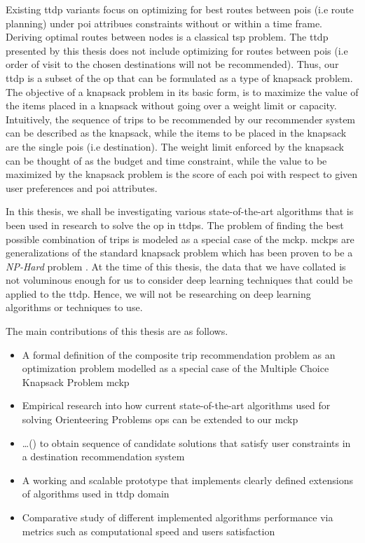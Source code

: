 Existing \gls{ttdp} variants focus on optimizing for best routes between \glspl{poi} (i.e route planning) under \gls{poi} attribues constraints without or within a time frame. Deriving optimal routes between nodes is a classical \gls{tsp} problem. The \gls{ttdp} presented by this thesis does not include optimizing for routes between \glspl{poi} (i.e order of visit to the chosen destinations will not be recommended). Thus, our \gls{ttdp} is a subset of the \gls{op} that can be formulated as a type of knapsack problem. The objective of a knapsack problem in its basic form, is to maximize the value of the items placed in a knapsack without going over a weight limit or capacity. Intuitively, the sequence of trips to be recommended by our recommender system can be described as the knapsack, while the items to be placed in the knapsack are the single \glspl{poi} (i.e destination). The weight limit enforced by the knapsack can be thought of as the budget and time constraint, while the value to be maximized by the knapsack problem is the score of each \gls{poi} with respect to given user preferences and \gls{poi} attributes.

In this thesis, we shall be investigating various state-of-the-art algorithms that is been used in research to solve the \gls{op} in \glspl{ttdp}. The problem of finding the best possible combination of trips is modeled as a special case of the \gls{mckp}. \Glspl{mckp} are generalizations of the standard knapsack problem which has been proven to be a \textit{NP-Hard} problem \parencite{Kellerer2004TheProblem}. At the time of this thesis, the data that we have collated is not voluminous enough for us to consider deep learning techniques that could be applied to the \gls{ttdp}. Hence, we will not be researching on deep learning algorithms or techniques to use.

The main contributions of this thesis are as follows.

\begin{itemize}
    \item A formal definition of the composite trip recommendation problem as an optimization problem modelled as a special case of the Multiple Choice Knapsack Problem \gls{mckp}
    \item Empirical research into how current state-of-the-art algorithms used for solving Orienteering Problems \glspl{op} can be extended to our \gls{mckp}
    \item \ldots () to obtain sequence of candidate solutions that satisfy user constraints in a destination recommendation system
    \item A working and scalable prototype that implements clearly defined extensions of algorithms used in \gls{ttdp} domain
    \item Comparative study of different implemented algorithms performance via metrics such as computational speed and users satisfaction
\end{itemize}


